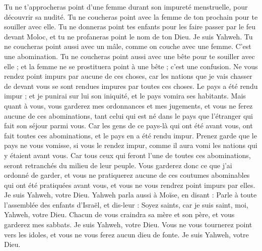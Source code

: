 \begin{multicols}{2}
Tu ne t'approcheras point d'une femme durant son impureté menstruelle, pour découvrir sa nudité.
Tu ne coucheras point avec la femme de ton prochain pour te souiller avec elle.
Tu ne donneras point tes enfants pour les faire passer par le feu devant Moloc, et tu ne profaneras point le nom de ton Dieu. Je suis Yahweh.
Tu ne coucheras point aussi avec un mâle, comme on couche avec une femme. C'est une abomination.
Tu ne coucheras point aussi avec une bête pour te souiller avec elle ; et la femme ne se prostituera point à une bête ; c’est une confusion.
Ne vous rendez point impurs par aucune de ces choses, car les nations que je vais chasser de devant vous se sont rendues impures par toutes ces choses.
Le pays a été rendu impur ; et je punirai sur lui son iniquité, et le pays vomira ses habitants.
Mais quant à vous, vous garderez mes ordonnances et mes jugements, et vous ne ferez aucune de ces abominations, tant celui qui est né dans le pays que l'étranger qui fait son séjour parmi vous.
Car les gens de ce pays-là qui ont été avant vous, ont fait toutes ces abominations, et le pays en a été rendu impur.
Prenez garde que le pays ne vous vomisse, si vous le rendez impur, comme il aura vomi les nations qui y étaient avant vous.
Car tous ceux qui feront l'une de toutes ces abominations, seront retranchés du milieu de leur peuple.
Vous garderez donc ce que j'ai ordonné de garder, et vous ne pratiquerez aucune de ces coutumes abominables qui ont été pratiquées avant vous, et vous ne vous rendrez point impurs par elles. Je suis Yahweh, votre Dieu.
\VerseOne{}Yahweh parla aussi à Moïse, en disant :
Parle à toute l'assemblée des enfants d'Israël, et dis-leur : Soyez saints, car je suis saint, moi, Yahweh, votre Dieu.
Chacun de vous craindra sa mère et son père, et vous garderez mes sabbats. Je suis Yahweh, votre Dieu.
Vous ne vous tournerez point vers les idoles, et vous ne vous ferez aucun dieu de fonte. Je suis Yahweh, votre Dieu.

\end{multicols}
